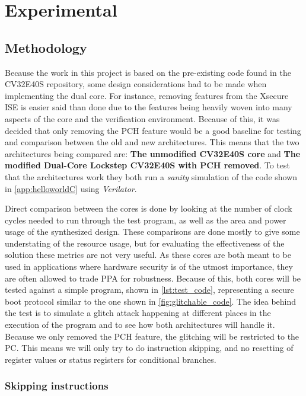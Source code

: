 \chapter{Experimental}
\label{chap4}

\section{Methodology}
\label{sec:method}

Because the work in this project is based on the pre-existing code found in the CV32E40S repository\cite{cv32e40s_manual}, some design considerations had to be made when implementing the dual core. For instance, removing features from the Xsecure ISE is easier said than done due to the features being heavily woven into many aspects of the core and the verification environment. Because of this, it was decided that only removing the PCH feature would be a good baseline for testing and comparison between the old and new architectures. This means that the two architectures being compared are: \textbf{The unmodified CV32E40S core} and \textbf{The modified Dual-Core Lockstep CV32E40S with PCH removed}. To test that the architectures work they both run a \textit{sanity} simulation of the code shown in \autoref{app:helloworldC} using \textit{Verilator}\cite{verilator}.

Direct comparison between the cores is done by looking at the number of clock cycles needed to run through the test program, as well as the area and power usage of the synthesized design. These comparisons are done mostly to give some understating of the resource usage, but for evaluating the effectiveness of the solution these metrics are not very useful. As these cores are both meant to be used in applications where hardware security is of the utmost importance, they are often allowed to trade PPA for robustness. Because of this, both cores will be tested against a simple program, shown in \autoref{lst:test_code}, representing a secure boot protocol similar to the one shown in \autoref{fig:glitchable_code}. The idea behind the test is to simulate a glitch attack happening at different places in the execution of the program and to see how both architectures will handle it. Because we only removed the PCH feature, the glitching will be restricted to the PC. This means we will only try to do instruction skipping, and no resetting of register values or status registers for conditional branches. 

\subsection{Skipping instructions}
\label{subsec:skip_instr}


